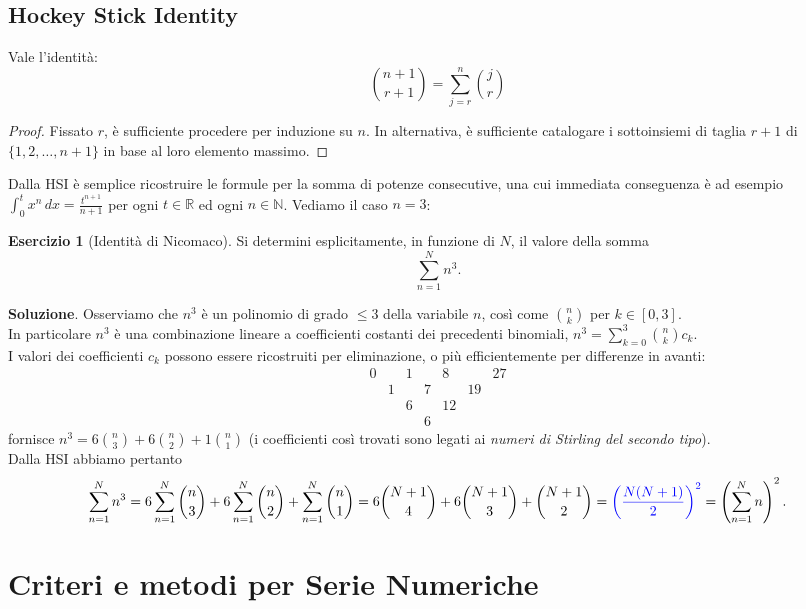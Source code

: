 \documentclass[a4paper,twoside]{article}
\newcommand{\N}{\mathbb{N}}
\newcommand{\R}{\mathbb{R}}
\theoremstyle{definition}
\newtheorem{ex}[theorem]{Esercizio}
\numberwithin{theorem}{section}
\begin{document}
\subsection{Hockey Stick Identity}
Vale l'identità:
$$\binom{n+1}{r+1}=\sum_{j=r}^{n}\binom{j}{r}$$
\begin{proof}
 Fissato $r$, è sufficiente procedere per induzione su $n$. In alternativa, è sufficiente catalogare i sottoinsiemi di taglia $r+1$ di $\{1,2,\ldots,n+1\}$ in base al loro elemento massimo.
\end{proof}
Dalla HSI è semplice ricostruire le formule per la somma di potenze consecutive, una cui immediata conseguenza è ad esempio $\int_{0}^{t}x^n\,dx = \frac{t^{n+1}}{n+1}$ per ogni $t\in\R$ ed ogni $n\in\N$. Vediamo il caso $n=3$:
\begin{ex}[Identità di Nicomaco] Si determini esplicitamente, in funzione di $N$, il valore della somma 
$$ \sum_{n=1}^{N} n^3. $$
 
\end{ex}
\textbf{Soluzione}. Osserviamo che $n^3$ è un polinomio di grado $\leq 3$ della variabile $n$, così come $\binom{n}{k}$ per $k\in[0,3]$.\\ In particolare $n^3$ è una combinazione lineare a coefficienti costanti dei precedenti binomiali, $n^3=\sum_{k=0}^{3}\binom{n}{k}c_k$.\\
I valori dei coefficienti $c_k$ possono essere ricostruiti per eliminazione, o più efficientemente per differenze in avanti:
$$\begin{array}{ccccccc} 0 && 1 && 8 && 27 \\ 
& 1 && 7 && 19 & \\
&& 6 && 12 && \\
&&& 6 &&&
\end{array} $$
fornisce $n^3=6\binom{n}{3}+6\binom{n}{2}+1\binom{n}{1}$ (i coefficienti così trovati sono legati ai \emph{numeri di Stirling del secondo tipo}).\\ Dalla HSI abbiamo pertanto
$$ \sum_{n=1}^{N}n^3 = 6\sum_{n=1}^{N}\binom{n}{3}+6\sum_{n=1}^{N}\binom{n}{2}+\sum_{n=1}^{N}\binom{n}{1}=6\binom{N+1}{4}+6\binom{N+1}{3}+\binom{N+1}{2}={\color{blue}\left(\frac{N(N+1)}{2}\right)^2}=\left(\sum_{n=1}^{N}n\right)^2.$$


    \section{Criteri e metodi per Serie Numeriche}
\end{document}
